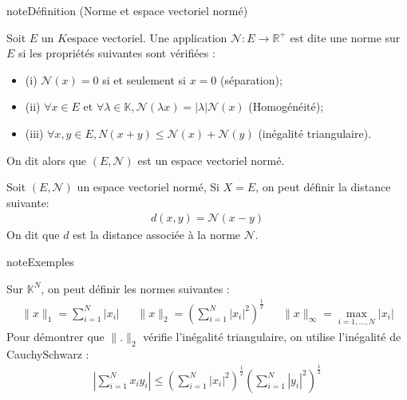 \documentclass[letterpaper,10pt,french]{sphinxmanual}
\begin{document}
\begin{sphinxadmonition}{note}{Définition (Norme et espace vectoriel normé)}

\sphinxAtStartPar
Soit \(E\) un \(K\)\sphinxhyphen{}espace vectoriel. Une application \(\mathcal N : E \to \mathbb R^+\) est dite une norme sur \(E\) si les propriétés suivantes sont vérifiées :
\begin{itemize}
\item {} 
\sphinxAtStartPar
(i) \(\mathcal N(x) = 0\) si et seulement si \(x=0\) (séparation);

\item {} 
\sphinxAtStartPar
(ii) \(\forall x \in E\) et \(\forall \lambda \in \mathbb K, \mathcal N(\lambda x) = |\lambda| \mathcal N(x)\) (Homogénéité);

\item {} 
\sphinxAtStartPar
(iii) \(\forall x, y \in E, N(x+y) \leq \mathcal N(x) + \mathcal N(y)\) (inégalité triangulaire).

\end{itemize}
\end{sphinxadmonition}

\sphinxAtStartPar
On dit alors que \((E, \mathcal N)\) est un espace vectoriel normé.

\sphinxAtStartPar
Soit \((E, \mathcal N)\) un espace vectoriel normé, Si \(X=E\), on peut définir la distance suivante:
\begin{equation*}
\begin{split}
d(x,y)=\mathcal N(x-y)
\end{split}
\end{equation*}
\sphinxAtStartPar
On dit que \(d\) est la distance associée à la norme \(\mathcal N\).

\begin{sphinxadmonition}{note}{Exemples}

\sphinxhyphen{} Sur \(\mathbb K^N\), on peut définir les normes suivantes :
\begin{equation*}
\begin{split}
\|x\|_1=\sum_{i=1}^N |x_i| ~~~~~~~ \|x\|_2=\left(\sum_{i=1}^N |x_i|^2 \right)^{\frac{1}{2}} ~~~~~~~ \|x\|_\infty=\max_{i=1,\ldots,N} |x_i| 
\end{split}
\end{equation*}
\sphinxAtStartPar
Pour démontrer que \(\|.\|_2\) vérifie l’inégalité triangulaire, on utilise l’inégalité de Cauchy\sphinxhyphen{}Schwarz :
\begin{equation*}
\begin{split}
\left | \sum_{i=1}^N x_iy_i \right| \leq \left(\sum_{i=1}^N |x_i|^2 \right)^{\frac{1}{2}}\left(\sum_{i=1}^N |y_i|^2\right)^{\frac{1}{2}}
\end{split}
\end{equation*}\end{sphinxadmonition}
\end{document}

